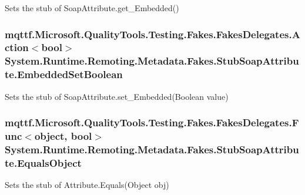 Sets the stub of Soap\-Attribute.\-get\-\_\-\-Embedded()

\hypertarget{class_system_1_1_runtime_1_1_remoting_1_1_metadata_1_1_fakes_1_1_stub_soap_attribute_ab9b57f65f4d1b78a2f093881894bded6}{
\subsubsection[{Embedded\-Set\-Boolean}]{\setlength{\rightskip}{0pt plus 5cm}mqttf.\-Microsoft.\-Quality\-Tools.\-Testing.\-Fakes.\-Fakes\-Delegates.\-Action$<$bool$>$ System.\-Runtime.\-Remoting.\-Metadata.\-Fakes.\-Stub\-Soap\-Attribute.\-Embedded\-Set\-Boolean}}\label{class_system_1_1_runtime_1_1_remoting_1_1_metadata_1_1_fakes_1_1_stub_soap_attribute_ab9b57f65f4d1b78a2f093881894bded6}


Sets the stub of Soap\-Attribute.\-set\-\_\-\-Embedded(\-Boolean value)

\hypertarget{class_system_1_1_runtime_1_1_remoting_1_1_metadata_1_1_fakes_1_1_stub_soap_attribute_a316fa3a3ee77ef70e4d79622d2855283}{
\subsubsection[{Equals\-Object}]{\setlength{\rightskip}{0pt plus 5cm}mqttf.\-Microsoft.\-Quality\-Tools.\-Testing.\-Fakes.\-Fakes\-Delegates.\-Func$<$object, bool$>$ System.\-Runtime.\-Remoting.\-Metadata.\-Fakes.\-Stub\-Soap\-Attribute.\-Equals\-Object}}\label{class_system_1_1_runtime_1_1_remoting_1_1_metadata_1_1_fakes_1_1_stub_soap_attribute_a316fa3a3ee77ef70e4d79622d2855283}


Sets the stub of Attribute.\-Equals(\-Object obj)

